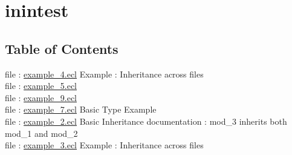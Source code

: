 \chapter*{inintest}
\hypertarget{ecldoc:toc:intest/inintest}{}


\section*{Table of Contents}
file : \hyperlink{ecldoc:toc:intest.inintest.example_4}{example\_4.ecl}  Example : Inheritance across files \\
file : \hyperlink{ecldoc:toc:intest.inintest.example_5}{example\_5.ecl}   \\
file : \hyperlink{ecldoc:toc:intest.inintest.example_9}{example\_9.ecl}   \\
file : \hyperlink{ecldoc:toc:intest.inintest.example_7}{example\_7.ecl}  Basic Type Example \\
file : \hyperlink{ecldoc:toc:intest.inintest.example_2}{example\_2.ecl}  Basic Inheritance documentation : mod\_3 inherits both mod\_1 and mod\_2 \\
file : \hyperlink{ecldoc:toc:intest.inintest.example_3}{example\_3.ecl}  Example : Inheritance across files \\







